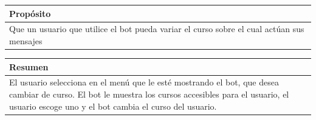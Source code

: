 \begin{table}[!ht]

\begin{tabular}{|m{10cm}|}
\hline\rowcolor{Gray}
{\bf Propósito}\\
\hline
{Que un usuario que utilice el bot pueda variar el curso sobre el cual actúan sus mensajes} \\
\hline

\end{tabular}


\end{table}

\begin{table}[!ht]

\begin{tabular}{|m{10cm}|}
\hline\rowcolor{Gray}
{\bf Resumen}\\
\hline
{El usuario selecciona en el menú que le esté mostrando el bot, que desea cambiar de curso. El bot le muestra los cursos accesibles para el usuario, el usuario escoge uno y el bot cambia el curso del usuario.} \\
\hline

\end{tabular}



\end{table}


